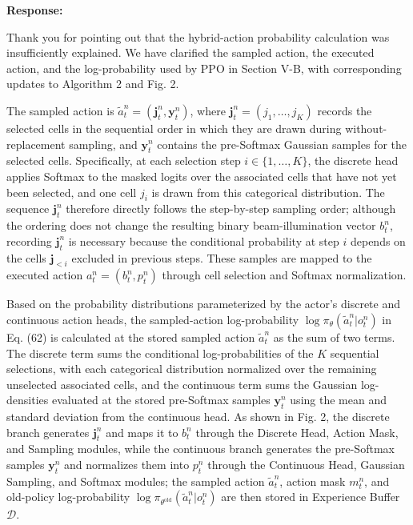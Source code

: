 \documentclass[11pt,a4paper]{article}
\begin{document}
\textbf{Response:}\par

Thank you for pointing out that the hybrid-action probability calculation was insufficiently explained. We have clarified the sampled action, the executed action, and the log-probability used by PPO in Section V-B, with corresponding updates to Algorithm 2 and Fig. 2.
\par

The sampled action is $\widetilde a_t^n=(\mathbf j_t^n,\mathbf y_t^n)$, where $\mathbf j_t^n=(j_1,\ldots,j_K)$ records the selected cells in the sequential order in which they are drawn during without-replacement sampling, and $\mathbf y_t^n$ contains the pre-Softmax Gaussian samples for the selected cells. Specifically, at each selection step $i\in\{1,\ldots,K\}$, the discrete head applies Softmax to the masked logits over the associated cells that have not yet been selected, and one cell $j_i$ is drawn from this categorical distribution. The sequence $\mathbf j_t^n$ therefore directly follows the step-by-step sampling order; although the ordering does not change the resulting binary beam-illumination vector $b_t^n$, recording $\mathbf j_t^n$ is necessary because the conditional probability at step $i$ depends on the cells $\mathbf j_{<i}$ excluded in previous steps. These samples are mapped to the executed action $a_t^n=(b_t^n,p_t^n)$ through cell selection and Softmax normalization.
\par

Based on the probability distributions parameterized by the actor's discrete and continuous action heads, the sampled-action log-probability $\log\pi_\theta(\widetilde a_t^n|o_t^n)$ in Eq. (62) is calculated at the stored sampled action $\widetilde a_t^n$ as the sum of two terms. The discrete term sums the conditional log-probabilities of the $K$ sequential selections, with each categorical distribution normalized over the remaining unselected associated cells, and the continuous term sums the Gaussian log-densities evaluated at the stored pre-Softmax samples $\mathbf y_t^n$ using the mean and standard deviation from the continuous head. As shown in Fig. 2, the discrete branch generates $\mathbf j_t^n$ and maps it to $b_t^n$ through the Discrete Head, Action Mask, and Sampling modules, while the continuous branch generates the pre-Softmax samples $\mathbf y_t^n$ and normalizes them into $p_t^n$ through the Continuous Head, Gaussian Sampling, and Softmax modules; the sampled action $\widetilde a_t^n$, action mask $m_t^n$, and old-policy log-probability $\log\pi_{\theta^{\mathrm{old}}}(\widetilde a_t^n|o_t^n)$ are then stored in Experience Buffer $\mathcal D$.
\par
\end{document}
